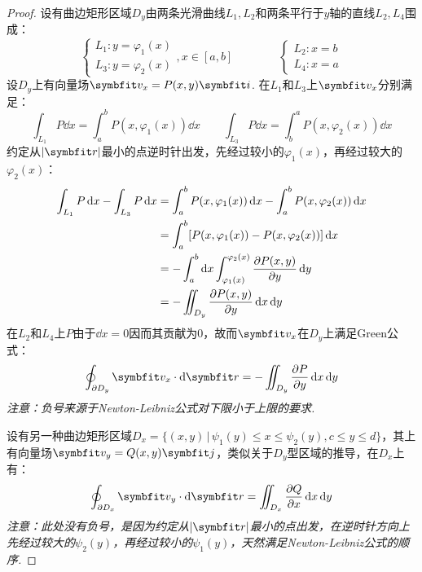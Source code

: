 \begin{proof}
    设有曲边矩形区域$D_y$由两条光滑曲线$L_1,L_2$和两条平行于$y$轴的直线$L_2,L_4$围成：
    \[\begin{cases}
        L_1:y = \varphi_1(x) \\ L_3:y = \varphi_2(x)
    \end{cases},x\in[a,b]\qquad\qquad \begin{cases}
        L_2:x = b \\ L_4:x = a
    \end{cases}\]
    设$D_y$上有向量场$\vb{v}_x = P(x,y)\vb{i}$.
    在$L_1$和$L_3$上$\vb{v}_x$分别满足：
    \[\int_{L_1}P\dd{x} = \int_{a}^{b}P(x,\varphi_1(x))\dd{x}\qquad \int_{L_3}P\dd{x} = \int_{b}^{a}P(x,\varphi_2(x))\dd{x}\]
    约定从$|\vb{r}|$最小的点逆时针出发，先经过较小的$\varphi_1(x)$，再经过较大的$\varphi_2(x)$：
    \begin{align*}
        \int_{L_1}P\dd{x} - \int_{L_3}P\dd{x} &= \int_{a}^{b}P(x,\varphi_1(x))\dd{x} - \int_{a}^{b}P(x,\varphi_2(x))\dd{x} \\
        &= \int_{a}^{b}[P(x,\varphi_1(x)) - P(x,\varphi_2(x))]\dd{x} \\
        &= -\int_{a}^{b}\dd{x}\int_{\varphi_1(x)}^{\varphi_2(x)}\pdv{P(x,y)}{y}\dd{y} \\
        &= -\iint_{D_y}\pdv{P(x,y)}{y}\dd{x}\dd{y}
    \end{align*}
    在$L_2$和$L_4$上$P$由于$\dd{x}=0$因而其贡献为$0$，故而$\vb{v}_x$在$D_y$上满足Green公式：
    \[\oint_{\partial D_y}\vb{v}_x\cdot\dd{\vb{r}} = -\iint_{D_y}\pdv{P}{y}\dd{x}\dd{y}\]
    \textit{注意：负号来源于Newton-Leibniz公式对下限小于上限的要求.}

    设有另一种曲边矩形区域$D_x = \{(x,y)\,|\,\psi_1(y)\leqslant x \leqslant \psi_2(y),c\leqslant y \leqslant d\}$，其上有向量场$\vb{v}_y = Q(x,y)\vb{j}$，类似关于$D_y$型区域的推导，在$D_x$上有：
    \[\oint_{\partial D_x}\vb{v}_y\cdot\dd{\vb{r}} = \iint_{D_x}\pdv{Q}{x}\dd{x}\dd{y}\]
    \textit{注意：此处没有负号，是因为约定从$|\vb{r}|$最小的点出发，在逆时针方向上先经过较大的$\psi_2(y)$，再经过较小的$\psi_1(y)$，天然满足Newton-Leibniz公式的顺序.}


\end{proof}

